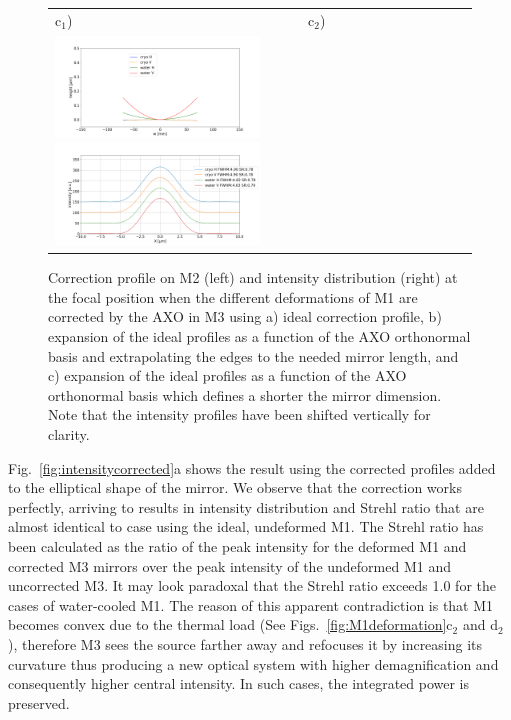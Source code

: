 \documentclass[preprint]{iucr}
\begin{document}
\begin{figure}
\begin{center}
\begin{tabular}{l}
  c$_1$)~~~~~~~~~~~~~~~~~~~~~~~~~~~~~~~~~
  c$_2$)\\
   \includegraphics[width=0.5\textwidth]{figures/correctionprofilescropped.png}
   \includegraphics[width=0.5\textwidth]{figures/intensitycorrectedcropped.png}\\
   \end{tabular}
   \end{center}
   \caption
   { Correction profile on M2 (left) and intensity distribution (right) at the focal position when the different deformations of M1 are corrected by the AXO in M3 using  a) ideal correction profile, b)  expansion of the ideal profiles as a function of the AXO orthonormal basis and extrapolating the edges to the needed mirror length, and c)  expansion of the ideal profiles as a function of the AXO orthonormal basis which defines a shorter the mirror dimension. Note that the intensity profiles have been shifted vertically for clarity. }
   \end{figure} 


Fig.~\ref{fig:intensitycorrected}a shows the result using the corrected profiles added to the elliptical shape of the mirror. We observe that the correction works perfectly, arriving to results in intensity distribution and Strehl ratio that are almost identical to case using the ideal, undeformed M1. The Strehl ratio has been calculated as the ratio of the peak intensity for the deformed M1 and corrected M3 mirrors over the peak intensity of the undeformed M1 and uncorrected M3. It may look paradoxal that the Strehl ratio exceeds 1.0 for the cases of water-cooled M1. The reason of this apparent contradiction is that M1 becomes convex due to the thermal load (See Figs.~\ref{fig:M1deformation}c$_2$ and d$_2$), therefore M3 sees the source farther away and refocuses it by increasing its curvature thus producing a new optical system with higher demagnification and consequently higher central intensity. In such cases, the integrated power is preserved.
\end{document}
